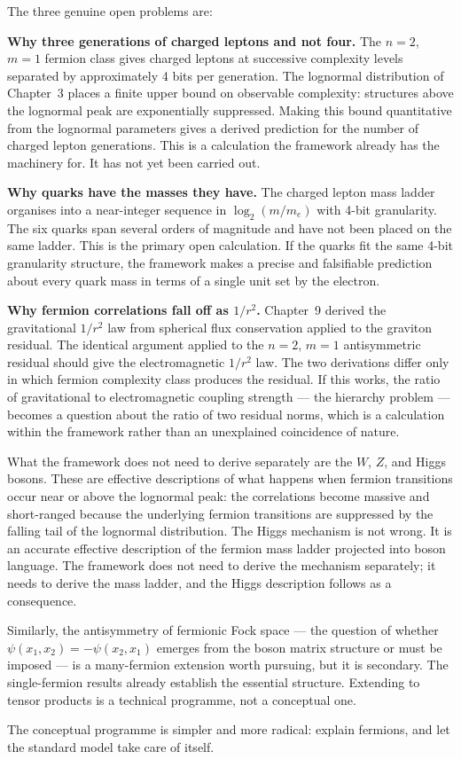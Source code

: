 The three genuine open problems are:

\textbf{Why three generations of charged leptons and not four.}
The $n=2$, $m=1$ fermion class gives charged leptons at successive
complexity levels separated by approximately 4 bits per generation.
The lognormal distribution of Chapter~3 places a finite upper bound on
observable complexity: structures above the lognormal peak are
exponentially suppressed. Making this bound quantitative from the
lognormal parameters gives a derived prediction for the number of
charged lepton generations. This is a calculation the framework already
has the machinery for. It has not yet been carried out.

\textbf{Why quarks have the masses they have.}
The charged lepton mass ladder organises into a near-integer sequence
in $\log_2(m/m_e)$ with 4-bit granularity. The six quarks span several
orders of magnitude and have not been placed on the same ladder. This
is the primary open calculation. If the quarks fit the same 4-bit
granularity structure, the framework makes a precise and falsifiable
prediction about every quark mass in terms of a single unit set by the
electron.

\textbf{Why fermion correlations fall off as $1/r^2$.}
Chapter~9 derived the gravitational $1/r^2$ law from spherical flux
conservation applied to the graviton residual. The identical argument
applied to the $n=2$, $m=1$ antisymmetric residual should give the
electromagnetic $1/r^2$ law. The two derivations differ only in which
fermion complexity class produces the residual. If this works, the
ratio of gravitational to electromagnetic coupling strength --- the
hierarchy problem --- becomes a question about the ratio of two
residual norms, which is a calculation within the framework rather than
an unexplained coincidence of nature.

What the framework does not need to derive separately are the $W$, $Z$,
and Higgs bosons. These are effective descriptions of what happens when
fermion transitions occur near or above the lognormal peak: the
correlations become massive and short-ranged because the underlying
fermion transitions are suppressed by the falling tail of the lognormal
distribution. The Higgs mechanism is not wrong. It is an accurate
effective description of the fermion mass ladder projected into boson
language. The framework does not need to derive the mechanism
separately; it needs to derive the mass ladder, and the Higgs
description follows as a consequence.

Similarly, the antisymmetry of fermionic Fock space --- the question
of whether $\psi(x_1, x_2) = -\psi(x_2, x_1)$ emerges from the boson
matrix structure or must be imposed --- is a many-fermion extension
worth pursuing, but it is secondary. The single-fermion results already
establish the essential structure. Extending to tensor products is a
technical programme, not a conceptual one.

The conceptual programme is simpler and more radical: explain fermions,
and let the standard model take care of itself.
